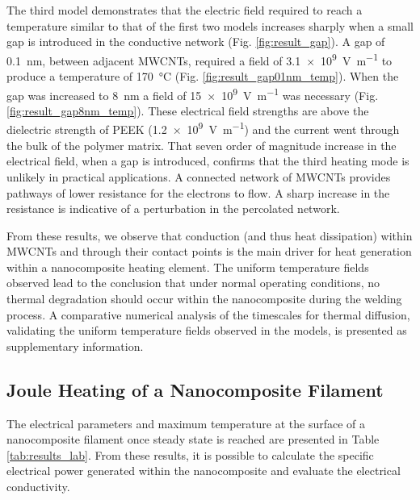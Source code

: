 \documentclass[11pt,review,times]{elsarticle}
\begin{document}
\FloatBarrier

The third model demonstrates that the electric field required to reach a temperature similar to that of the first two models increases sharply when a small gap is introduced in the conductive network (Fig. \ref{fig:result_gap}). 
A gap of \SI{0.1}{\nano\metre}, between adjacent MWCNTs, required a field of \SI{3.1e9}{\volt\per\metre} to produce a temperature of \SI{170}{\celsius} (Fig. \ref{fig:result_gap01nm_temp}). 
When the gap was increased to \SI{8}{\nano\metre} a field of \SI{15e9}{\volt\per\metre} was necessary (Fig. \ref{fig:result_gap8nm_temp}). 
These electrical field strengths are above the dielectric strength of PEEK (\SI{1.2e9}{\volt\per\metre}) and the current went through the bulk of the polymer matrix. 
That seven order of magnitude increase in the electrical field, when a gap is introduced, confirms that the third heating mode is unlikely in practical applications. 
A connected network of MWCNTs provides pathways of lower resistance for the electrons to flow. 
A sharp increase in the resistance is indicative of a perturbation in the percolated network. 

From these results, we observe that conduction (and thus heat dissipation) within MWCNTs and through their contact points is the main driver for heat generation within a nanocomposite heating element. 
The uniform temperature fields observed lead to the conclusion that under normal operating conditions, no thermal degradation should occur within the nanocomposite during the welding process. 
A comparative numerical analysis of the timescales for thermal diffusion, validating the uniform temperature fields observed in the models, is presented as supplementary information.  

\subsection{Joule Heating of a Nanocomposite Filament}

The electrical parameters and maximum temperature at the surface of a nanocomposite filament once steady state is reached are presented in Table \ref{tab:results_lab}. 
From these results, it is possible to calculate the specific electrical power generated within the nanocomposite and evaluate the electrical conductivity. 
\end{document}

